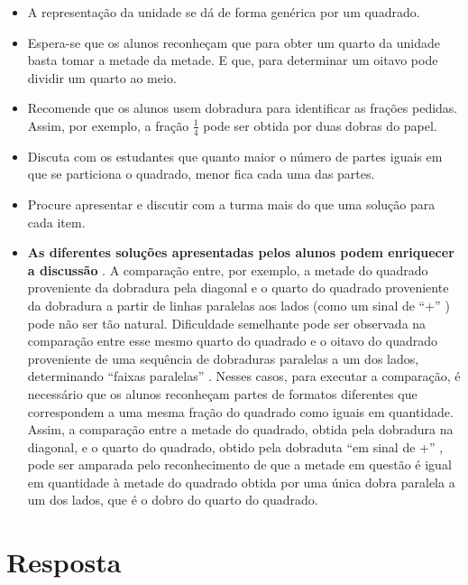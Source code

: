 \documentclass{book}
\begin{document}
\begin{itemize} %
    \item       A representação da unidade se dá de forma genérica por um quadrado. 
    \item       Espera-se que os alunos reconheçam que para obter um quarto da unidade basta tomar a metade da metade. E que, para determinar um oitavo pode dividir um quarto ao meio.
    \item       Recomende que os alunos usem dobradura para identificar as frações pedidas. Assim, por exemplo, a fração       $\frac{1}{4}$       pode ser obtida por duas dobras do papel.    
    \item       Discuta com os estudantes que quanto maior o número de partes iguais em que se particiona o quadrado, menor fica cada uma das partes.
    \item       Procure apresentar e discutir com a turma mais do que uma solução para cada item.
    \item             {\bf As diferentes soluções apresentadas pelos alunos podem enriquecer a discussão}      . A comparação entre, por exemplo, a metade do quadrado proveniente da dobradura pela diagonal e o quarto do quadrado proveniente da dobradura a partir de linhas paralelas aos lados (como um sinal de       ``+''      ) pode não ser tão natural. Dificuldade semelhante pode ser observada na comparação entre esse mesmo quarto do quadrado e o oitavo do quadrado proveniente de uma sequência de dobraduras paralelas a um dos lados, determinando       ``faixas paralelas''      . Nesses casos, para executar a comparação, é necessário que os alunos reconheçam partes de formatos diferentes que correspondem a uma mesma fração do quadrado como iguais em quantidade. Assim, a comparação entre a metade do quadrado, obtida pela dobradura na diagonal, e o quarto do quadrado, obtido pela dobraduta       ``em sinal de +''      , pode ser amparada pelo reconhecimento de que a metade em questão é igual em quantidade à metade do quadrado obtida por uma única dobra paralela a um dos lados, que é o dobro do quarto do quadrado.  
\end{itemize} %
  
  
  
  



\section{Resposta}  
  
\end{document}
